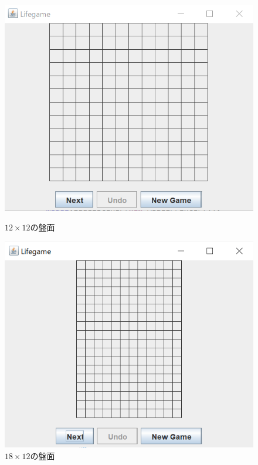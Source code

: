 \documentclass[dvipdfmx]{jarticle}
\begin{document}
\begin{figure}[htbp]
  \begin{minipage}[b]{0.45\linewidth}
    \centering
    \includegraphics[keepaspectratio, scale=0.4]{panel_normal.png}
    \caption{$12\times12$の盤面}
  \end{minipage}
  \begin{minipage}[b]{0.45\linewidth}
    \centering
    \includegraphics[keepaspectratio, scale=0.4]{1812.png}
    \caption{$18\times12$の盤面}
  \end{minipage}
\end{figure}
\end{document}

